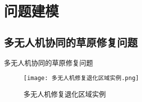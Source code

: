 \documentclass{ctexbeamer}
\begin{document}
\section{问题建模}
\subsection{多无人机协同的草原修复问题}
\begin{frame}{多无人机协同的草原修复问题}

    \begin{figure}[!h]
        \centering
        \texttt{[image: 多无人机修复退化区域实例.png]}
        \caption{多无人机修复退化区域实例}
        \label{fig:my_label}
    \end{figure}
\end{frame}
\end{document}
